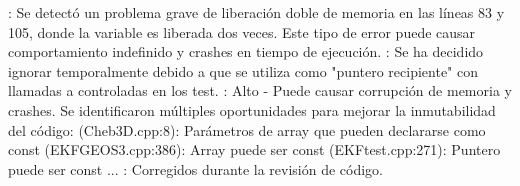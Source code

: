 \markdownRendererDocumentBegin
\markdownRendererSectionBegin
{}\markdownRendererInterblockSeparator
{}\markdownRendererSectionBegin
{}\markdownRendererInterblockSeparator
{}: Se detectó un problema grave de liberación doble de memoria en las líneas 83 y 105, donde la variable  es liberada dos veces. Este tipo de error puede causar comportamiento indefinido y crashes en tiempo de ejecución.\markdownRendererInterblockSeparator
{}\markdownRendererUlBeginTight
\markdownRendererUlItem {}: Se ha decidido ignorar temporalmente debido a que  se utiliza como "puntero recipiente" con llamadas a  controladas en los test.\markdownRendererUlItemEnd 
\markdownRendererUlItem {}: Alto - Puede causar corrupción de memoria y crashes.\markdownRendererUlItemEnd 
\markdownRendererUlEndTight \markdownRendererInterblockSeparator
{}
\markdownRendererSectionEnd \markdownRendererSectionBegin
{}\markdownRendererInterblockSeparator
{}\markdownRendererSectionBegin
{}\markdownRendererInterblockSeparator
{}Se identificaron múltiples oportunidades para mejorar la inmutabilidad del código:\markdownRendererInterblockSeparator
{}\markdownRendererUlBeginTight
\markdownRendererUlItem {} (Cheb3D.cpp:8): Parámetros de array que pueden declararse como const\markdownRendererUlItemEnd 
\markdownRendererUlItem {} (EKF\markdownRendererUnderscore{}GEOS3.cpp:386): Array  puede ser const \markdownRendererUlItemEnd 
\markdownRendererUlItem {} (EKFtest.cpp:271): Puntero  puede ser const\markdownRendererUlItemEnd 
\markdownRendererUlItem ...\markdownRendererUlItemEnd 
\markdownRendererUlEndTight \markdownRendererInterblockSeparator
{}: Corregidos durante la revisión de código.\markdownRendererInterblockSeparator
{}
\markdownRendererSectionEnd \markdownRendererSectionBegin
{}\markdownRendererInterblockSeparator
